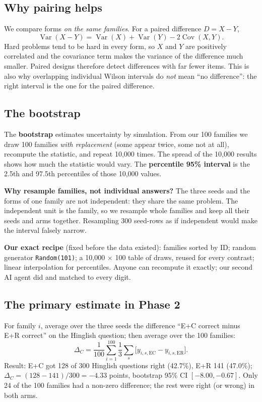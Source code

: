 \documentclass[11pt,a4paper]{article}
\begin{document}
\subsection{Why pairing helps}
We compare forms \emph{on the same families}. For a paired difference $D = X - Y$,
\[ \operatorname{Var}(X - Y) = \operatorname{Var}(X) + \operatorname{Var}(Y) - 2\operatorname{Cov}(X,Y). \]
Hard problems tend to be hard in every form, so $X$ and $Y$ are positively correlated and the covariance term makes the variance of the difference much smaller. Paired designs therefore detect differences with far fewer items. This is also why overlapping individual Wilson intervals do \emph{not} mean ``no difference'': the right interval is the one for the paired difference.

\subsection{The bootstrap}
The \textbf{bootstrap} estimates uncertainty by simulation. From our 100 families we draw 100 families \emph{with replacement} (some appear twice, some not at all), recompute the statistic, and repeat 10{,}000 times. The spread of the 10{,}000 results shows how much the statistic would vary. The \textbf{percentile 95\% interval} is the 2.5th and 97.5th percentiles of those 10{,}000 values.

\textbf{Why resample families, not individual answers?} The three seeds and the forms of one family are not independent: they share the same problem. The independent unit is the family, so we resample whole families and keep all their seeds and arms together. Resampling 300 seed-rows as if independent would make the interval falsely narrow.

\textbf{Our exact recipe} (fixed before the data existed): families sorted by ID; random generator \texttt{Random(101)}; a 10{,}000 $\times$ 100 table of draws, reused for every contrast; linear interpolation for percentiles. Anyone can recompute it exactly; our second AI agent did and matched to every digit.

\subsection{The primary estimate in Phase 2}
For family $i$, average over the three seeds the difference ``E+C correct minus E+R correct'' on the Hinglish question; then average over the 100 families:
\[ \Delta_C = \frac{1}{100}\sum_{i=1}^{100} \frac{1}{3}\sum_{s} \big[y_{i,s,\text{EC}} - y_{i,s,\text{ER}}\big]. \]
Result: E+C got 128 of 300 Hinglish questions right (42.7\%), E+R 141 (47.0\%); $\Delta_C = (128-141)/300 = -4.33$ points, bootstrap 95\% CI $[-8.00, -0.67]$. Only 24 of the 100 families had a non-zero difference; the rest were right (or wrong) in both arms.
\end{document}
